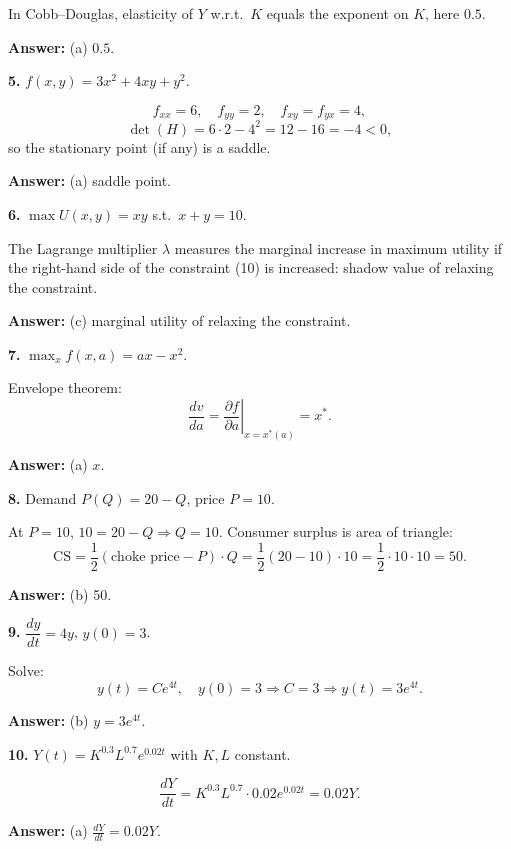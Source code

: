 \documentclass[12pt]{article}
\begin{document}
In Cobb--Douglas, elasticity of \(Y\) w.r.t.\ \(K\) equals the exponent on \(K\), here \(0.5\).

\textbf{Answer:} (a) \(0.5\).

\medskip

\textbf{5.} \(f(x,y)=3x^2 + 4xy + y^2\).

\[
f_{xx}=6,\quad f_{yy}=2,\quad f_{xy}=f_{yx}=4,
\]
\[
\det(H)=6\cdot 2 - 4^2 = 12 - 16 = -4 < 0,
\]
so the stationary point (if any) is a saddle.

\textbf{Answer:} (a) saddle point.

\medskip

\textbf{6.} \(\max U(x,y)=xy\) s.t.\ \(x+y=10\).

The Lagrange multiplier \(\lambda\) measures the marginal increase in maximum utility if the right-hand side of the constraint (10) is increased: shadow value of relaxing the constraint.

\textbf{Answer:} (c) marginal utility of relaxing the constraint.

\medskip

\textbf{7.} \(\max_x f(x,a)=ax - x^2\).

Envelope theorem: 
\[
\frac{dv}{da} = \left.\frac{\partial f}{\partial a}\right|_{x=x^\ast(a)} = x^\ast.
\]

\textbf{Answer:} (a) \(x\).

\medskip

\textbf{8.} Demand \(P(Q)=20-Q\), price \(P=10\).

At \(P=10\), \(10=20-Q \Rightarrow Q=10\).  
Consumer surplus is area of triangle:
\[
\text{CS} = \frac{1}{2}(\text{choke price}-P)\cdot Q
= \frac{1}{2}(20-10)\cdot 10 = \frac{1}{2}\cdot 10\cdot 10 = 50.
\]

\textbf{Answer:} (b) 50.

\medskip

\textbf{9.} \(\dfrac{dy}{dt}=4y\), \(y(0)=3\).

Solve:
\[
y(t)=Ce^{4t},\quad y(0)=3 \Rightarrow C=3 \Rightarrow y(t)=3e^{4t}.
\]

\textbf{Answer:} (b) \(y=3e^{4t}\).

\medskip
\newpage
\textbf{10.} \(Y(t)=K^{0.3} L^{0.7} e^{0.02 t}\) with \(K,L\) constant.

\[
\frac{dY}{dt} = K^{0.3} L^{0.7} \cdot 0.02 e^{0.02 t} = 0.02 Y.
\]

\textbf{Answer:} (a) \(\frac{dY}{dt}=0.02Y\).

\bigskip
\end{document}
